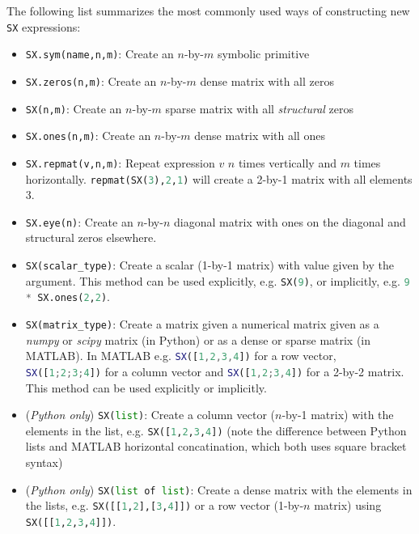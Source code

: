 \documentclass[a4paper,12pt]{book}
\begin{document}
The following list summarizes the most commonly used ways of constructing new \texttt{SX} expressions:
\begin{itemize}
  \item \lstinline[language=Python]{SX.sym(name,n,m)}: Create an $n$-by-$m$ symbolic primitive
  \item \lstinline[language=Python]{SX.zeros(n,m)}: Create an $n$-by-$m$ dense matrix with all zeros
  \item \lstinline[language=Python]{SX(n,m)}: Create an $n$-by-$m$ sparse matrix with all \emph{structural} zeros
  \item \lstinline[language=Python]{SX.ones(n,m)}: Create an $n$-by-$m$ dense matrix with all ones
  \item \lstinline[language=Python]{SX.repmat(v,n,m)}: Repeat expression $v$ $n$ times vertically and $m$ times horizontally. \lstinline[language=Python]{repmat(SX(3),2,1)} will create a 2-by-1 matrix with all elements 3.
  \item \lstinline[language=Python]{SX.eye(n)}: Create an $n$-by-$n$ diagonal matrix with ones on the diagonal and structural zeros elsewhere.
  \item \lstinline[language=Python]{SX(scalar_type)}: Create a scalar (1-by-1 matrix) with value given by the argument. This method can be used explicitly, e.g. \lstinline[language=Python]{SX(9)}, or implicitly, e.g. \lstinline[language=Python]{9 * SX.ones(2,2)}.
  \item \lstinline[language=Python]{SX(matrix_type)}: Create a matrix given a numerical matrix given as a \emph{numpy} or \emph{scipy} matrix (in Python) or as a dense or sparse matrix (in MATLAB). In MATLAB e.g.
  \lstinline[language=Matlab]{SX([1,2,3,4])} for a row vector, \lstinline[language=Matlab]{SX([1;2;3;4])} for a column vector and \lstinline[language=Matlab]{SX([1,2;3,4])} for a 2-by-2 matrix. This method can be used explicitly or implicitly.
  \item (\emph{Python only}) \lstinline[language=Python]{SX(list)}: Create a column vector ($n$-by-1 matrix) with the elements in the list, e.g. \lstinline[language=Python]{SX([1,2,3,4])} (note the difference between Python lists and MATLAB horizontal concatination, which both uses square bracket syntax)
  \item (\emph{Python only}) \lstinline[language=Python]{SX(list of list)}: Create a dense matrix with the elements in the lists, e.g. \lstinline[language=Python]{SX([[1,2],[3,4]])} or a row vector (1-by-$n$ matrix) using \lstinline[language=Python]{SX([[1,2,3,4]])}.
\end{itemize}
\end{document}
